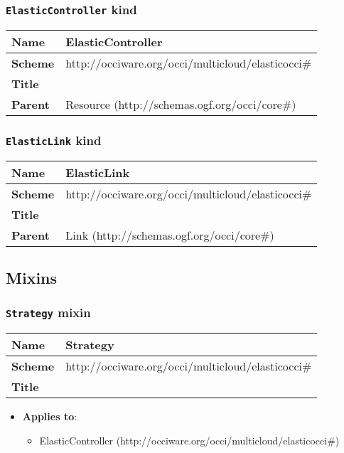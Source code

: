 \subsubsection{\texttt{ElasticController} kind}
\begin{center}
\begin{tabular}{|l|l|}
  \hline
  \textbf{Name} & ElasticController \\
  \hline  
  \textbf{Scheme} & http://occiware.org/occi/multicloud/elasticocci\# \\
  \hline
  \textbf{Title} &  \\
  \hline
  \textbf{Parent} & Resource (http://schemas.ogf.org/occi/core\#) \\
  \hline
\end{tabular}
\end{center}



\subsubsection{\texttt{ElasticLink} kind}
\begin{center}
\begin{tabular}{|l|l|}
  \hline
  \textbf{Name} & ElasticLink \\
  \hline  
  \textbf{Scheme} & http://occiware.org/occi/multicloud/elasticocci\# \\
  \hline
  \textbf{Title} &  \\
  \hline
  \textbf{Parent} & Link (http://schemas.ogf.org/occi/core\#) \\
  \hline
\end{tabular}
\end{center}



\subsection{Mixins}
\subsubsection{\texttt{Strategy} mixin}
\begin{center}
\begin{tabular}{|l|l|}
  \hline
  \textbf{Name} & Strategy \\
  \hline  
  \textbf{Scheme} & http://occiware.org/occi/multicloud/elasticocci\# \\
  \hline
  \textbf{Title} &  \\
  \hline
\end{tabular}
\end{center}
\begin{itemize}
\item \textbf{Applies to}:
\begin{itemize}
	\item ElasticController (http://occiware.org/occi/multicloud/elasticocci\#)
\end{itemize}
\end{itemize} 



